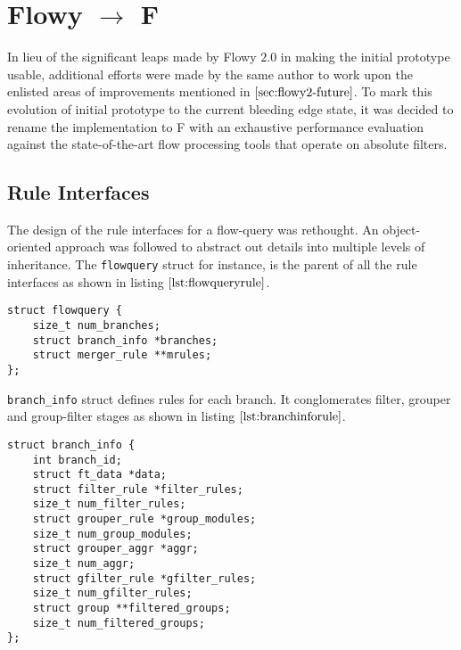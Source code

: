 \chapter{Flowy $\longrightarrow$ F}\label{ch:f}

In lieu of the significant leaps made by Flowy $2.0$ in making the initial prototype usable, additional efforts were made by the same author to work upon the enlisted areas of improvements mentioned in $\ref{sec:flowy2-future}$. To mark this evolution of initial prototype to the current bleeding edge state, it was decided to rename the implementation to F \cite{jschauer:2012} with an exhaustive performance evaluation against the state-of-the-art flow processing tools \cite{sromig:2000, phaag:2006} that operate on absolute filters.

\section{Rule Interfaces}\label{sec:rule-interfaces}
The design of the rule interfaces for a flow-query was rethought. An object-oriented  approach was followed to abstract out details into multiple levels of inheritance. The \texttt{flowquery} struct for instance, is the parent of all the rule interfaces as shown in listing $\ref{lst:flowqueryrule}$.
\begin{lstlisting}
struct flowquery {
	size_t num_branches;
	struct branch_info *branches;
	struct merger_rule **mrules;
};
\end{lstlisting}

\texttt{branch\_info} struct  defines rules for each branch. It conglomerates filter, grouper and group-filter stages as shown in listing $\ref{lst:branchinforule}$. 
\begin{lstlisting}
struct branch_info {
	int branch_id;
	struct ft_data *data;
	struct filter_rule *filter_rules;
	size_t num_filter_rules;
	struct grouper_rule *group_modules;
	size_t num_group_modules;
	struct grouper_aggr *aggr;
	size_t num_aggr;
	struct gfilter_rule *gfilter_rules;
	size_t num_gfilter_rules;
	struct group **filtered_groups;
	size_t num_filtered_groups;
};
\end{lstlisting}

